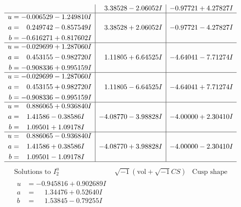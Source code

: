 \documentclass[1p]{elsarticle_modified}
\theoremstyle{definition}
\newcommand{\I}{\sqrt{-1}}
\begin{document}
$$\begin{array}{c|c|c}
 & \phantom{-}3.38528 - 2.06052 I & -0.97721 + 4.27827 I \\ \hline\begin{aligned}
u &= -0.006529 - 1.249810 I \\
a &= \phantom{-}0.249742 - 0.857549 I \\
b &= -0.616271 + 0.817602 I\end{aligned}
 & \phantom{-}3.38528 + 2.06052 I & -0.97721 - 4.27827 I \\ \hline\begin{aligned}
u &= -0.029699 + 1.287060 I \\
a &= \phantom{-}0.453155 - 0.982720 I \\
b &= -0.908336 + 0.995159 I\end{aligned}
 & \phantom{-}1.11805 + 6.64525 I & -4.64041 - 7.71274 I \\ \hline\begin{aligned}
u &= -0.029699 - 1.287060 I \\
a &= \phantom{-}0.453155 + 0.982720 I \\
b &= -0.908336 - 0.995159 I\end{aligned}
 & \phantom{-}1.11805 - 6.64525 I & -4.64041 + 7.71274 I \\ \hline\begin{aligned}
u &= \phantom{-}0.886065 + 0.936840 I \\
a &= \phantom{-}1.41586 - 0.38586 I \\
b &= \phantom{-}1.09501 + 1.09178 I\end{aligned}
 & -4.08770 - 3.98828 I & -4.00000 + 2.30410 I \\ \hline\begin{aligned}
u &= \phantom{-}0.886065 - 0.936840 I \\
a &= \phantom{-}1.41586 + 0.38586 I \\
b &= \phantom{-}1.09501 - 1.09178 I\end{aligned}
 & -4.08770 + 3.98828 I & -4.00000 - 2.30410 I\\
 \hline 
 \end{array}$$\newpage$$\begin{array}{c|c|c}  
\text{Solutions to }I^u_{2}& \I (\text{vol} + \sqrt{-1}CS) & \text{Cusp shape}\\
 \hline 
\begin{aligned}
u &= -0.945816 + 0.902689 I \\
a &= \phantom{-}1.34476 + 0.52640 I \\
b &= \phantom{-}1.53845 - 0.79255 I\end{aligned}

\end{array}$$
\end{document}
